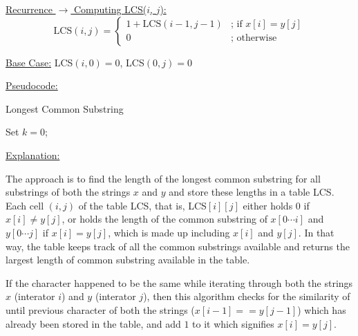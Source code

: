 \documentclass[letterpaper,11pt]{article}
\begin{document}
\underline{Recurrence $\rightarrow$ Computing LCS($i$, $j$):} 
    \begin{equation}
        \text{LCS}(i, j) =
            \begin{cases}
                1 + \text{LCS}(i-1, j-1) & \text{; if } x[i] = y[j]\\
                0 & \text{; otherwise }
            \end{cases}
    \end{equation}

\underline{Base Case:} LCS$(i, 0) = 0$, LCS$(0, j) = 0$

\underline{Pseudocode:}

\begin{algorithm}
    
    \caption{Longest Common Substring}
    

    
    Set $k = 0$;
    

\end{algorithm}





\underline{Explanation:}

The approach is to find the length of the longest common substring for all substrings of both the strings $x$ and $y$ and store these lengths in a table LCS. Each cell $(i,j)$ of the table LCS, that is, LCS$[i][j]$ either holds $0$ if $x[i] \neq y[j]$, or holds the length of the common substring of $x[0 \cdots i]$ and $y[0 \cdots j]$ if $x[i] = y[j]$, which is made up including $x[i]$ and $y[j]$. In that way, the table keeps track of all the common substrings available and returns the largest length of common substring available in the table.

If the character happened to be the same while iterating through both the strings $x$ (interator $i$) and $y$ (interator $j$), then this algorithm checks for the similarity of until previous character of both the strings ($x[i-1] == y[j-1]$) which has already been stored in the table, and add $1$ to it which signifies $x[i] = y[j]$.
\end{document}
